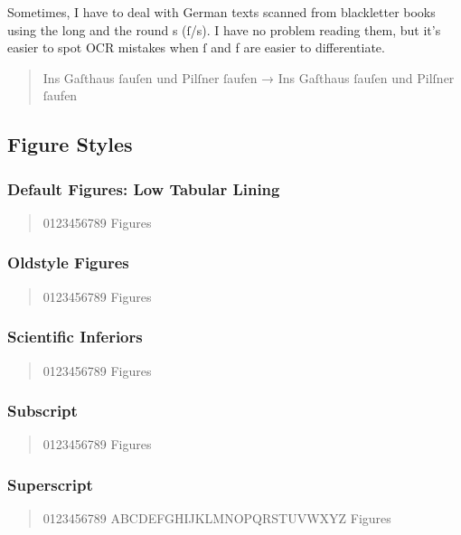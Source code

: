 Sometimes, I have to deal with German texts scanned from blackletter books using the long and the round s (ſ/s). I have no problem reading them, but it’s easier to spot OCR mistakes when ſ and f are easier to differentiate.

\begin{quote}
Ins Gaſthaus ſauſen und Pilſner ſaufen → { Ins Gaſthaus ſauſen und Pilſner ſaufen}
\end{quote}

\subsection{Figure Styles}

\subsubsection{Default Figures: Low Tabular Lining}

\begin{quote}
0123456789 Figures
\end{quote}

\subsubsection{Oldstyle Figures}
\begin{quote}
{ 0123456789 Figures}
\end{quote}

\subsubsection{Scientific Inferiors}
\begin{quote}
{ 0123456789 Figures}
\end{quote}

\subsubsection{Subscript}
\begin{quote}
{ 0123456789 Figures}
\end{quote}

\subsubsection{Superscript}
\begin{quote}
{ 0123456789 ABCDEFGHIJKLMNOPQRSTUVWXYZ} Figures
\end{quote}

